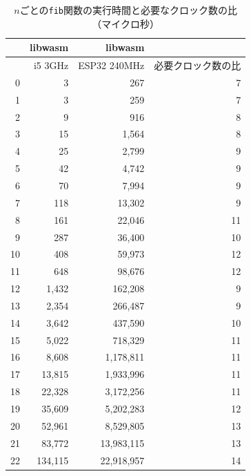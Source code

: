 \begin{table}[htbp]
  \label{tab:fib_time}
  \caption{$n$ごとの{\tt fib}関数の実行時間と必要なクロック数の比（マイクロ秒）}
  \begin{center}
    \begin{tabular}{|r|r|r|r|}
      \hline
        & libwasm   & libwasm       &           \\ \hline
        & i5 3GHz   & ESP32 240MHz  & 必要クロック数の比 \\ \hline
      0  & 3         & 267           & 7  \\ \hline
      1  & 3         & 259           & 7  \\ \hline
      2  & 9         & 916           & 8  \\ \hline
      3  & 15        & 1,564         & 8  \\ \hline
      4  & 25        & 2,799         & 9  \\ \hline
      5  & 42        & 4,742         & 9  \\ \hline
      6  & 70        & 7,994         & 9  \\ \hline
      7  & 118       & 13,302        & 9  \\ \hline
      8  & 161       & 22,046        & 11 \\ \hline
      9  & 287       & 36,400        & 10 \\ \hline
      10 & 408       & 59,973        & 12 \\ \hline
      11 & 648       & 98,676        & 12 \\ \hline
      12 & 1,432     & 162,208       & 9  \\ \hline
      13 & 2,354     & 266,487       & 9  \\ \hline
      14 & 3,642     & 437,590       & 10 \\ \hline
      15 & 5,022     & 718,329       & 11 \\ \hline
      16 & 8,608     & 1,178,811     & 11 \\ \hline
      17 & 13,815    & 1,933,996     & 11 \\ \hline
      18 & 22,328    & 3,172,256     & 11 \\ \hline
      19 & 35,609    & 5,202,283     & 12 \\ \hline
      20 & 52,961    & 8,529,805     & 13 \\ \hline
      21 & 83,772    & 13,983,115    & 13 \\ \hline
      22 & 134,115   & 22,918,957    & 14 \\ \hline

\end{tabular}
\end{center}
\end{table}
